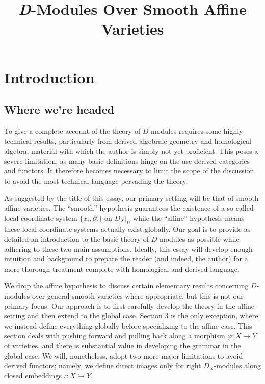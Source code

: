 
\usepackage{indentfirst}

\title{\textit{D}-Modules Over Smooth Affine Varieties}
\date{}

\usepackage{titling}
\renewcommand\maketitlehooka{\null\mbox{}\vfill}
\renewcommand\maketitlehookd{\vfill\null}

\maketitle

\newpage

\tableofcontents
\newpage
\section*{Introduction}

\subsection*{Where we're headed}
\noindent To give a complete account of the theory of $D$-modules requires some highly technical results, particularly from derived algebraic geometry and homological algebra, material with which the author is simply not yet proficient. This poses a severe limitation, as many basic definitions hinge on the use derived categories and functors. It therefore becomes necessary to limit the scope of the discussion to avoid the most technical language pervading the theory. 

As suggested by the title of this essay, our primary setting will be that of smooth affine varieties. The ``smooth'' hypothesis guarantees the existence of a so-called local coordinate system $\{x_i,\partial_i\}$ on $D_X|_U$ while the ``affine'' hypothesis means these local coordinate systems actually exist globally. Our goal is to provide as detailed an introduction to the basic theory of $D$-modules as possible while adhering to these two main assumptions. Ideally, this essay will develop enough intuition and background to prepare the reader (and indeed, the author) for a more thorough treatment complete with homological and derived language.

We drop the affine hypothesis to discuss certain elementary results concerning $D$-modules over general smooth varieties where appropriate, but this is not our primary focus. Our approach is to first carefully develop the theory in the affine setting and then extend to the global case. Section 3 is the only exception, where we instead define everything globally before specializing to the affine case. This section deals with pushing forward and pulling back along a morphism $\varphi:X\to Y$ of varieties, and there is substantial value in developing the grammar in the global case. We will, nonetheless, adopt two more major limitations to avoid derived functors; namely, we define direct images only for right $D_X$-modules along closed embeddings $\iota:X\hookrightarrow Y$.

